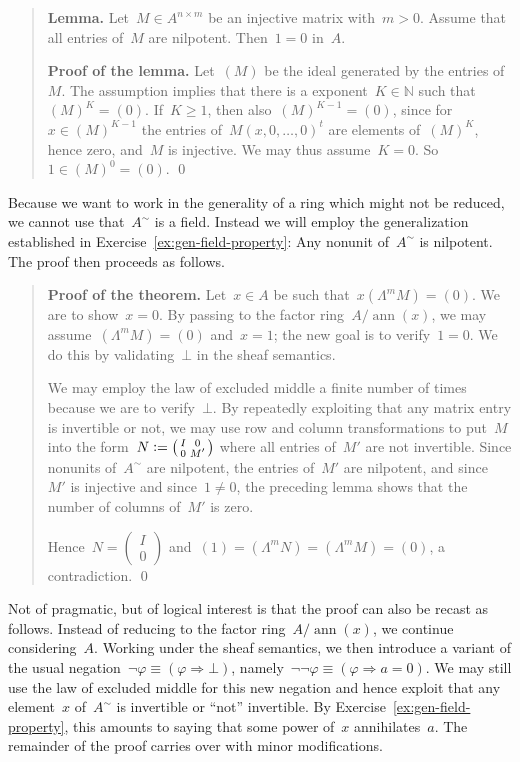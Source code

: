 \documentclass{ws-rv9x6}
\newcommand{\NN}{\mathbb{N}}
\newcommand{\defeq}{\vcentcolon=}
\renewcommand{\_}{\mathpunct{.}}
\newcommand{\?}{\,{:}\,}
\newcommand{\ann}{\operatorname{ann}}
\newcommand{\negg}{\neg\!\!\!\neg}
\begin{document}
\begin{quote}
\textbf{Lemma.} Let~$M \in A^{n \times m}$ be an injective matrix with~$m > 0$. Assume that all entries
of~$M$ are nilpotent. Then~$1 = 0$ in~$A$.

\textbf{Proof of the lemma.} Let~$(M)$ be the ideal generated by the entries
of~$M$. The assumption implies that there is a exponent~$K \in \NN$ such that~$(M)^K = (0)$.
If~$K \geq 1$, then also~$(M)^{K-1} = (0)$, since for~$x \in (M)^{K-1}$ the
entries of~$M (x,0,\ldots,0)^t$ are elements of~$(M)^K$, hence zero,
and~$M$ is injective. We may thus assume~$K = 0$. So~$1 \in (M)^0 = (0)$. \qed
\end{quote}
Because we want to work in the generality of
a ring which might not be reduced, we cannot use that~$A^\sim$ is a field.
Instead we will employ the generalization established in
Exercise~\ref{ex:gen-field-property}: Any nonunit of~$A^\sim$ is nilpotent. The
proof then proceeds as follows.\par
\begin{quote}
\textbf{Proof of the theorem.} Let~$x \in A$ be such that~$x (\Lambda^m M) = (0)$. We are to
show~$x = 0$. By passing to the factor ring~$A/\ann(x)$, we may
assume~$(\Lambda^m M) = (0)$ and~$x = 1$; the new goal is to verify~$1 = 0$. We
do this by validating~$\bot$ in the sheaf semantics.

We may employ the law of excluded middle a finite number of times because we
are to verify~$\bot$. By repeatedly exploiting that any matrix entry is
invertible or not, we may use row and column transformations to put~$M$ into
the form~$N \defeq \left(\begin{smallmatrix}I&0\\0&M'\end{smallmatrix}\right)$ where all
entries of~$M'$ are not invertible. Since nonunits of~$A^\sim$ are nilpotent, the entries of~$M'$ are
nilpotent, and since~$M'$ is injective and since~$1 \neq 0$, the preceding lemma
shows that the number of columns of~$M'$ is zero.

Hence~$N = \left(\begin{smallmatrix}I\\0\end{smallmatrix}\right)$ and~$(1) =
(\Lambda^m N) = (\Lambda^m M) = (0)$, a contradiction. \qed
\end{quote}

\begin{remark}Not of pragmatic, but of logical interest is that the proof can
also be recast as follows. Instead of reducing to the factor ring~$A/\ann(x)$,
we continue considering~$A$. Working under the sheaf semantics, we then
introduce a variant of the usual negation~$\neg\varphi \equiv (\varphi
\Rightarrow \bot)$, namely~$\negg\varphi \equiv (\varphi \Rightarrow a = 0)$.
We may still use the law of excluded middle for this new negation and hence
exploit that any element~$x$ of~$A^\sim$ is invertible or ``not'' invertible. By
Exercise~\ref{ex:gen-field-property}, this amounts to saying that some power
of~$x$ annihilates~$a$. The remainder of the proof carries over with minor
modifications.
\end{remark}
\end{document}
